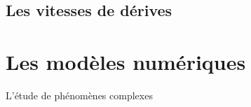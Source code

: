 \subsection{Les vitesses de dérives}
\label{vitessesDerive}
\section{Les modèles numériques}
L'étude de phénomènes complexes
%





